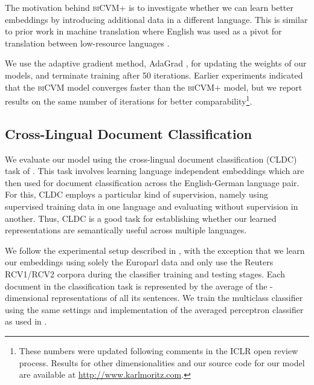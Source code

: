 \documentclass{article} \pdfoutput=1
\newcommand{\biCVM}{\textsc{biCVM}\xspace}
\newcommand{\biCVMplus}{\textsc{biCVM+}\xspace}
\begin{document}
The motivation behind \biCVMplus is to investigate whether we can learn better
embeddings by introducing additional data in a different language.  This is
similar to prior work in machine translation where English was used as a pivot
for translation between low-resource languages \cite{Cohn:2007}.

We use the adaptive gradient method, AdaGrad \cite{Duchi:2011}, for updating the
weights of our models, and terminate training after 50 iterations. Earlier
experiments indicated that the \biCVM model converges faster than the \biCVMplus
model, but we report results on the same number of iterations for better
comparability\footnote{These numbers were updated following comments in the ICLR
  open review process. Results for other dimensionalities and our source code
  for our model are available at \url{http://www.karlmoritz.com}.}.

\subsection{Cross-Lingual Document Classification}

We evaluate our model using the cross-lingual document classification (CLDC)
task of \citet{Klementiev:2012}.  This task involves learning language
independent embeddings which are then used for document classification across
the English-German language pair.  For this, CLDC employs a particular kind of
supervision, namely using supervised training data in one language and
evaluating without supervision in another.  Thus, CLDC is a good task for
establishing whether our learned representations are semantically useful across
multiple languages.

We follow the experimental setup described in \cite{Klementiev:2012}, with the
exception that we learn our embeddings using solely the Europarl data and only
use the Reuters RCV1/RCV2 corpora during the classifier training and testing
stages.  Each document in the classification task is represented by the average
of the -dimensional representations of all its sentences.  We train the
multiclass classifier using the same settings and implementation of the averaged
perceptron classifier \cite{Collins:2002} as used in \cite{Klementiev:2012}.
\end{document}
